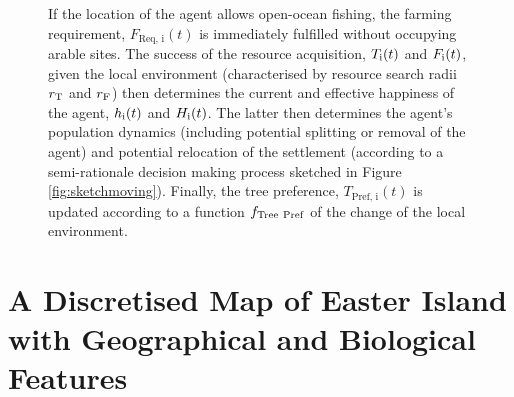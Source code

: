 \begin{figure}[H]
{		If the location of the agent allows open-ocean fishing, the farming requirement, $F_\text{Req, i}(t)$ is immediately fulfilled without occupying arable sites.
		The success of the resource acquisition, $T_{\rm i}(t)$ and $F_{\rm i} (t)$, given the local environment (characterised by resource search radii $r_{\rm T}$ and $r_{\rm F}$) then determines the current and effective happiness of the agent, $h_{\rm i}(t)$ and $H_{\rm i}(t)$. %
		The latter then determines the agent's population dynamics (including potential splitting or removal of the agent) and potential relocation of the settlement (according to a semi-rationale decision making process sketched in Figure \ref{fig:sketchmoving}).
		Finally, the tree preference, $T_\text{Pref, i}(t)$ is updated according to a function $f_{\rm Tree \ Pref}$ of the change of the local environment.
	}
	\label{fig:SketchABM}
\end{figure}

\FloatBarrier
\section{A Discretised Map of Easter Island with Geographical and Biological Features}\label{sec:CreateMap}
